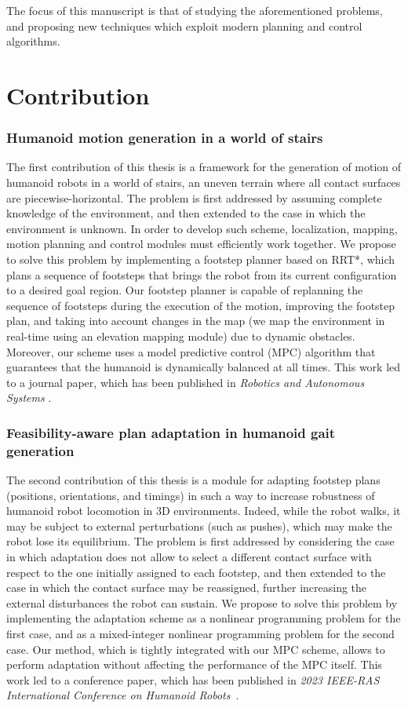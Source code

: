 The focus of this manuscript is that of studying the aforementioned problems,
and proposing new techniques which exploit modern planning and control
algorithms.

\section{Contribution}
\subsubsection{Humanoid motion generation in a world of stairs}
The first contribution of this thesis is a framework for the generation of 
motion of humanoid robots in a world of stairs, an uneven terrain 
where all contact surfaces are piecewise-horizontal. The problem is first 
addressed by assuming complete knowledge of the environment, and then 
extended to the case in which the environment is unknown. In order to 
develop such scheme, localization, mapping, motion planning 
and control modules must efficiently work together. We propose to solve this 
problem by implementing a footstep planner based on RRT*, which 
plans a sequence of footsteps that brings the robot from its current 
configuration to a desired goal region. Our footstep planner is 
capable of replanning the sequence of footsteps during the execution of the 
motion, improving the footstep plan, and taking into account changes 
in the map (we map the environment in real-time using an elevation mapping 
module) due to dynamic obstacles. Moreover, our scheme
uses a model predictive control (MPC) algorithm that guarantees that the humanoid is
dynamically balanced at all times. This work led to a journal paper, which 
has been published in \textit{Robotics and Autonomous Systems} 
\cite{Cipriano2023RAS}.

\subsubsection{Feasibility-aware plan adaptation in humanoid gait generation}
The second contribution of this thesis is a module for adapting footstep plans 
(positions, orientations, and timings) in such a way to increase robustness 
of humanoid robot locomotion in 3D environments.
Indeed, while the robot walks, it may be subject 
to external perturbations (such as pushes), which may make the robot lose its 
equilibrium. The problem is first addressed by considering the case in which 
adaptation does not allow to select a different contact surface with respect
to the one initially assigned to each footstep, and then extended to the case 
in which the contact surface may be reassigned, further increasing the external 
disturbances the robot can sustain. We propose to solve this problem by 
implementing the adaptation scheme as a nonlinear programming problem for the
first case, and as a mixed-integer nonlinear programming problem for the
second case. Our method, which is tightly integrated with our MPC scheme,
allows to perform adaptation without affecting the performance of the MPC
itself. This work led to a conference paper, which has been published 
in \textit{2023 IEEE-RAS International Conference on Humanoid
Robots}~\cite{Cipriano2023Humanoids}.

